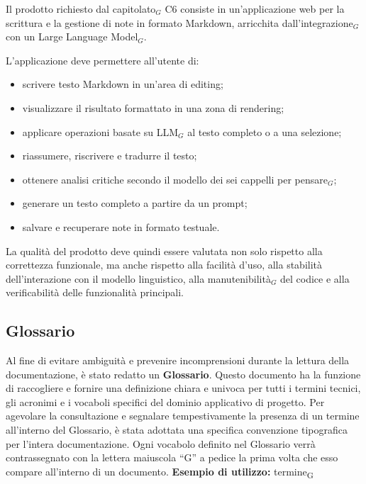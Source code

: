 \documentclass[a4paper, 10pt, colorlinks=true, linkcolor=black, urlcolor=blue, citecolor=blue, hidelinks]{article}
\begin{document}
Il prodotto richiesto dal capitolato$_G$ C6 consiste in un'applicazione web per la scrittura e la gestione di note in formato Markdown, arricchita dall'integrazione$_G$ con un Large Language Model$_G$.

L'applicazione deve permettere all'utente di:
\begin{itemize}
    \item scrivere testo Markdown in un'area di editing;
    \item visualizzare il risultato formattato in una zona di rendering;
    \item applicare operazioni basate su LLM$_G$ al testo completo o a una selezione;
    \item riassumere, riscrivere e tradurre il testo;
    \item ottenere analisi critiche secondo il modello dei sei cappelli per pensare$_G$;
    \item generare un testo completo a partire da un prompt;
    \item salvare e recuperare note in formato testuale.
\end{itemize}

La qualità del prodotto deve quindi essere valutata non solo rispetto alla correttezza funzionale, ma anche rispetto alla facilità d'uso, alla stabilità dell'interazione con il modello linguistico, alla manutenibilità$_G$ del codice e alla verificabilità delle funzionalità principali.

\subsection{Glossario}
Al fine di evitare ambiguità e prevenire incomprensioni durante la lettura della documentazione, è stato redatto un \textbf{Glossario}. Questo documento ha la funzione di raccogliere e fornire una definizione chiara e univoca per tutti i termini tecnici, gli acronimi e i vocaboli specifici del dominio applicativo di progetto.
Per agevolare la consultazione e segnalare tempestivamente la presenza di un termine all'interno del Glossario, è stata adottata una specifica convenzione tipografica per l'intera documentazione. 
Ogni vocabolo definito nel Glossario verrà contrassegnato con la lettera maiuscola ``G'' a pedice la prima volta che esso compare all'interno di un documento.
\vspace{0.3cm}
\noindent \textbf{Esempio di utilizzo:} 
termine\textsubscript{G} %
\end{document}
